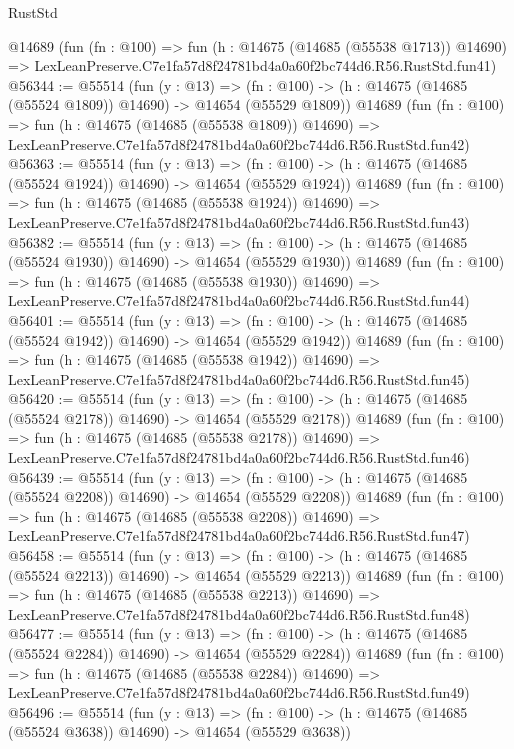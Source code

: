 \begin{lexlean}{RustStd}
\begin{coremodule}
    @14689
    (fun (fn : @100) =>
    fun (h : @14675 (@14685 (@55538 @1713)) @14690) =>
    LexLeanPreserve.C7e1fa57d8f24781bd4a0a60f2bc744d6.R56.RustStd.fun41)
@56344 := @55514
    (fun (y : @13) =>
    (fn : @100) -> (h : @14675 (@14685 (@55524 @1809)) @14690) -> @14654 (@55529 @1809))
    @14689
    (fun (fn : @100) =>
    fun (h : @14675 (@14685 (@55538 @1809)) @14690) =>
    LexLeanPreserve.C7e1fa57d8f24781bd4a0a60f2bc744d6.R56.RustStd.fun42)
@56363 := @55514
    (fun (y : @13) =>
    (fn : @100) -> (h : @14675 (@14685 (@55524 @1924)) @14690) -> @14654 (@55529 @1924))
    @14689
    (fun (fn : @100) =>
    fun (h : @14675 (@14685 (@55538 @1924)) @14690) =>
    LexLeanPreserve.C7e1fa57d8f24781bd4a0a60f2bc744d6.R56.RustStd.fun43)
@56382 := @55514
    (fun (y : @13) =>
    (fn : @100) -> (h : @14675 (@14685 (@55524 @1930)) @14690) -> @14654 (@55529 @1930))
    @14689
    (fun (fn : @100) =>
    fun (h : @14675 (@14685 (@55538 @1930)) @14690) =>
    LexLeanPreserve.C7e1fa57d8f24781bd4a0a60f2bc744d6.R56.RustStd.fun44)
@56401 := @55514
    (fun (y : @13) =>
    (fn : @100) -> (h : @14675 (@14685 (@55524 @1942)) @14690) -> @14654 (@55529 @1942))
    @14689
    (fun (fn : @100) =>
    fun (h : @14675 (@14685 (@55538 @1942)) @14690) =>
    LexLeanPreserve.C7e1fa57d8f24781bd4a0a60f2bc744d6.R56.RustStd.fun45)
@56420 := @55514
    (fun (y : @13) =>
    (fn : @100) -> (h : @14675 (@14685 (@55524 @2178)) @14690) -> @14654 (@55529 @2178))
    @14689
    (fun (fn : @100) =>
    fun (h : @14675 (@14685 (@55538 @2178)) @14690) =>
    LexLeanPreserve.C7e1fa57d8f24781bd4a0a60f2bc744d6.R56.RustStd.fun46)
@56439 := @55514
    (fun (y : @13) =>
    (fn : @100) -> (h : @14675 (@14685 (@55524 @2208)) @14690) -> @14654 (@55529 @2208))
    @14689
    (fun (fn : @100) =>
    fun (h : @14675 (@14685 (@55538 @2208)) @14690) =>
    LexLeanPreserve.C7e1fa57d8f24781bd4a0a60f2bc744d6.R56.RustStd.fun47)
@56458 := @55514
    (fun (y : @13) =>
    (fn : @100) -> (h : @14675 (@14685 (@55524 @2213)) @14690) -> @14654 (@55529 @2213))
    @14689
    (fun (fn : @100) =>
    fun (h : @14675 (@14685 (@55538 @2213)) @14690) =>
    LexLeanPreserve.C7e1fa57d8f24781bd4a0a60f2bc744d6.R56.RustStd.fun48)
@56477 := @55514
    (fun (y : @13) =>
    (fn : @100) -> (h : @14675 (@14685 (@55524 @2284)) @14690) -> @14654 (@55529 @2284))
    @14689
    (fun (fn : @100) =>
    fun (h : @14675 (@14685 (@55538 @2284)) @14690) =>
    LexLeanPreserve.C7e1fa57d8f24781bd4a0a60f2bc744d6.R56.RustStd.fun49)
@56496 := @55514
    (fun (y : @13) =>
    (fn : @100) -> (h : @14675 (@14685 (@55524 @3638)) @14690) -> @14654 (@55529 @3638))

\end{coremodule}
\end{lexlean}

